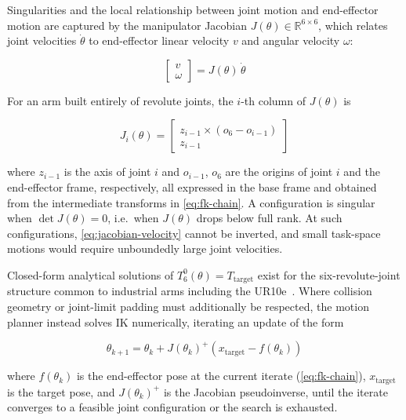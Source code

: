 \documentclass[oneside,studentpaper]{wbk}
\begin{document}
Singularities and the local relationship between joint motion and end-effector motion are captured by the manipulator Jacobian $J(\theta) \in \mathbb{R}^{6\times6}$, which relates joint velocities $\dot{\theta}$ to end-effector linear velocity $v$ and angular velocity $\omega$:

\begin{equation}\label{eq:jacobian-velocity}
  \begin{bmatrix} v \\ \omega \end{bmatrix} = J(\theta)\,\dot{\theta}
\end{equation}

For an arm built entirely of revolute joints, the $i$-th column of $J(\theta)$ is

\begin{equation}\label{eq:jacobian-column}
  J_i(\theta) =
  \begin{bmatrix}
    z_{i-1} \times (o_6 - o_{i-1}) \\
    z_{i-1}
  \end{bmatrix}
\end{equation}

where $z_{i-1}$ is the axis of joint $i$ and $o_{i-1}$, $o_6$ are the origins of joint $i$ and the end-effector frame, respectively, all expressed in the base frame and obtained from the intermediate transforms in \cref{eq:fk-chain}. A configuration is singular when $\det J(\theta) = 0$, i.e.\ when $J(\theta)$ drops below full rank. At such configurations, \cref{eq:jacobian-velocity} cannot be inverted, and small task-space motions would require unboundedly large joint velocities.

Closed-form analytical solutions of $T_6^0(\theta) = T_{\mathrm{target}}$ exist for the six-revolute-joint structure common to industrial arms including the UR10e~\cite{siciliano2009robotics}. Where collision geometry or joint-limit padding must additionally be respected, the motion planner instead solves IK numerically, iterating an update of the form

\begin{equation}\label{eq:jacobian-ik-update}
  \theta_{k+1} = \theta_k + J(\theta_k)^{+}\left(x_{\mathrm{target}} - f(\theta_k)\right)
\end{equation}

where $f(\theta_k)$ is the end-effector pose at the current iterate (\cref{eq:fk-chain}), $x_{\mathrm{target}}$ is the target pose, and $J(\theta_k)^{+}$ is the Jacobian pseudoinverse, until the iterate converges to a feasible joint configuration or the search is exhausted.
\end{document}
